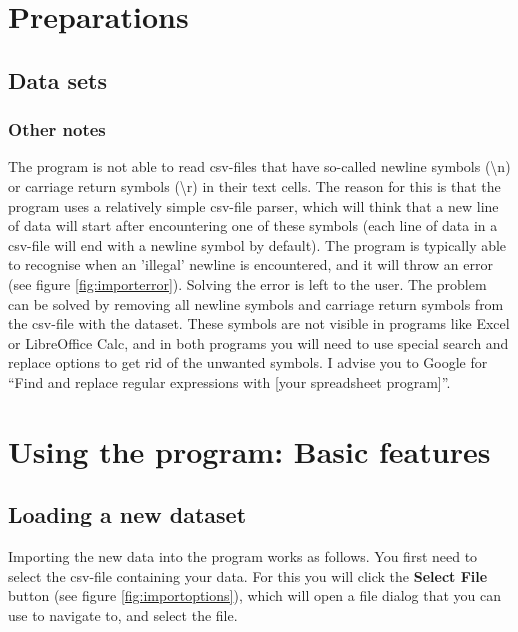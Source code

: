 \documentclass{memoir}
\begin{document}
\chapter{Preparations}
\label{chap:preparations}

\section{Data sets}
\label{sec:datasets}


\subsection{Other notes}
\label{sec:othernotesdatasets}

The program is not able to read csv-files that have so-called newline symbols (\textbackslash n) or carriage return symbols (\textbackslash r) in their text cells. The reason for this is that the program uses a relatively simple csv-file parser, which will think that a new line of data will start after encountering one of these symbols (each line of data in a csv-file will end with a newline symbol by default). The program is typically able to recognise when an 'illegal' newline is encountered, and it will throw an error (see figure \ref{fig:importerror}). Solving the error is left to the user. The problem can be solved by removing all newline symbols and carriage return symbols from the csv-file with the dataset. These symbols are not visible in programs like Excel or LibreOffice Calc, and in both programs you will need to use special search and replace options to get rid of the unwanted symbols. I advise you to Google for ``Find and replace regular expressions with [your spreadsheet program]''. 

\chapter{Using the program: Basic features}
\label{chap:usingtheprogram}

\section{Loading a new dataset}
\label{sec:loadingnewdataset}

Importing the new data into the program works as follows. You first need to select the csv-file containing your data. For this you will click the \textbf{Select File} button (see figure \ref{fig:importoptions}), which will open a file dialog that you can use to navigate to, and select the file.
\end{document}
